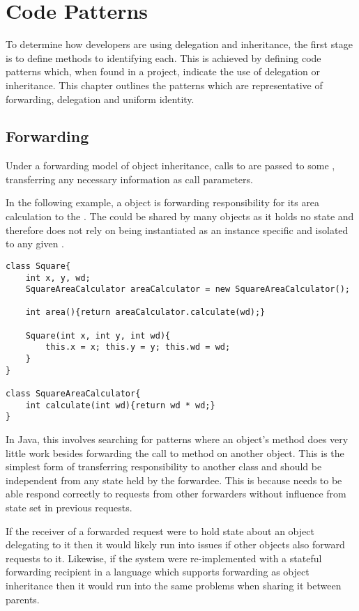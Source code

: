 \chapter{Code Patterns}\label{C:bg}
To determine how developers are using delegation and inheritance, the first stage is to define methods to identifying each. This is achieved by defining code patterns which, when found in a project, indicate the use of delegation or inheritance. This chapter outlines the patterns which are representative of forwarding, delegation and uniform identity.

\section{Forwarding}
Under a forwarding model of object inheritance, calls to  are passed to some , transferring any necessary information as call parameters.
\newline

In the following example, a  object is forwarding responsibility for its area calculation to the . The  could be shared by many  objects as it holds no state and therefore does not rely on being instantiated as an instance specific and isolated to any given .

\begin{lstlisting}
class Square{
	int x, y, wd;
	SquareAreaCalculator areaCalculator = new SquareAreaCalculator();

	int area(){return areaCalculator.calculate(wd);}

	Square(int x, int y, int wd){
		this.x = x; this.y = y; this.wd = wd;
	}
}

class SquareAreaCalculator{
	int calculate(int wd){return wd * wd;}
}
\end{lstlisting}

In Java, this involves searching for patterns where an object's method does very little work besides forwarding the call to method on another object. This is the simplest form of transferring responsibility to another class and should be independent from any state held by the forwardee. This is because needs to be able respond correctly to requests from other forwarders without influence from state set in previous requests.

If the receiver of a forwarded request were to hold state about an object delegating to it then it would likely run into issues if other objects also forward requests to it. Likewise, if the system were re-implemented with a stateful forwarding recipient in a language which supports forwarding as object inheritance then it would run into the same problems when sharing it between parents.

